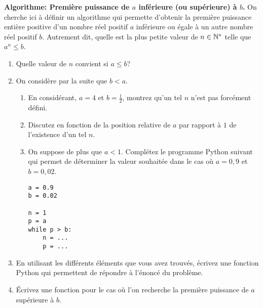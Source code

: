 \begin{exercise}
	\textbf{Algorithme: Première puissance de $a$ inférieure (ou supérieure) à $b$.} On cherche ici à définir un algorithme qui permette d'obtenir la première puissance entière positive d'un nombre réel positif $a$ inférieure ou égale à un autre nombre réel positif $b$. Autrement dit, quelle est la plus petite valeur de $n\in\mathbb{N}^*$ telle que $a^n\leq b$.
	\begin{enumerate}
		\item Quelle valeur de $n$ convient si $a\leq b$?
		\item On considère par la suite que $b<a$.
		\begin{enumerate}
			\item En considérant, $a=4$ et $b=\frac{1}{2}$, montrez qu'un tel $n$ n'est pas forcément défini.
			\item Discutez en fonction de la position relative de $a$ par rapport à $1$ de l'existence d'un tel $n$.
			\item On suppose de plus que $a<1$. Complétez le programme Python suivant qui permet de déterminer la valeur souhaitée dans le cas où $a=0,9$ et $b=0,02$.
\begin{center}
	\begin{varwidth}[t]{.5\textwidth}
		\begin{lstlisting}[language=iPython,linewidth = 4cm]
a = 0.9
b = 0.02

n = 1
p = a
while p > b:
    n = ...
    p = ...
\end{lstlisting}\end{varwidth}\end{center}
		\end{enumerate}
	\item En utilisant les différents éléments que vous avez trouvés, écrivez une fonction Python qui permettent de répondre à l'énoncé du problème.
	\item Écrivez une fonction pour le cas où l'on recherche la première puissance de $a$ supérieure à $b$.
	\end{enumerate}
\end{exercise}




